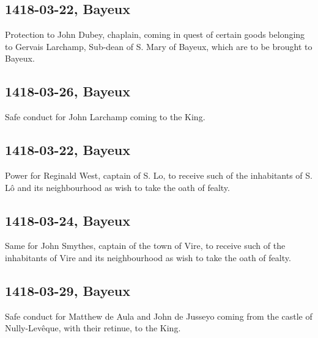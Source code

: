\documentclass[a4paper,12pt,twoside]{book}
\begin{document}
            \subsection{1418-03-22, Bayeux}
            
                     Protection to John Dubey, chaplain, coming in quest of certain goods belonging to Gervais Larchamp, Sub-dean of S. Mary of Bayeux, which are to be brought to Bayeux.
                  
            \subsection{1418-03-26, Bayeux}
            
                     Safe conduct for John Larchamp coming to the King.
                  
            \subsection{1418-03-22, Bayeux}
            
                     Power for Reginald West, captain of S. Lo, to receive such of the inhabitants of S. Lô and its neighbourhood as wish to take the oath of fealty.
                  
            \subsection{1418-03-24, Bayeux}
            
                     Same for John Smythes, captain of the town of Vire, to receive such of the inhabitants of Vire and its neighbourhood as wish to take the oath of fealty.
                  
            \subsection{1418-03-29, Bayeux}
            
                     Safe conduct for Matthew de Aula and John de Jusseyo coming from the castle of Nully-Levêque, with their retinue, to the King.
                  
            \newpage
           
    \printindex[indiv]
    
\end{document}
